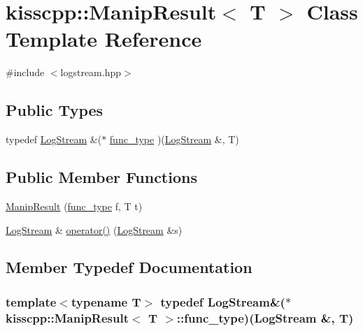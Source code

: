 \hypertarget{a00033}{\section{kisscpp\-:\-:Manip\-Result$<$ T $>$ Class Template Reference}
\label{a00033}
}


{\ttfamily \#include $<$logstream.\-hpp$>$}

\subsection*{Public Types}
\begin{DoxyCompactItemize}
\item 
typedef \hyperlink{a00031}{Log\-Stream} \&($\ast$ \hyperlink{a00033_a5948a01e3f4c7a21c7e15320b570a37a}{func\-\_\-type} )(\hyperlink{a00031}{Log\-Stream} \&, T)
\end{DoxyCompactItemize}
\subsection*{Public Member Functions}
\begin{DoxyCompactItemize}
\item 
\hyperlink{a00033_a6e6d19e8dfc6691db531c3a753b1fd5f}{Manip\-Result} (\hyperlink{a00033_a5948a01e3f4c7a21c7e15320b570a37a}{func\-\_\-type} f, T t)
\item 
\hyperlink{a00031}{Log\-Stream} \& \hyperlink{a00033_adedf89338ced5430d3d35dbe49cdaee8}{operator()} (\hyperlink{a00031}{Log\-Stream} \&s)
\end{DoxyCompactItemize}


\subsection{Member Typedef Documentation}
\hypertarget{a00033_a5948a01e3f4c7a21c7e15320b570a37a}{
\subsubsection[{func\-\_\-type}]{\setlength{\rightskip}{0pt plus 5cm}template$<$typename T$>$ typedef {\bf Log\-Stream}\&($\ast$ {\bf kisscpp\-::\-Manip\-Result}$<$ T $>$\-::func\-\_\-type)({\bf Log\-Stream} \&, T)}}\label{a00033_a5948a01e3f4c7a21c7e15320b570a37a}


